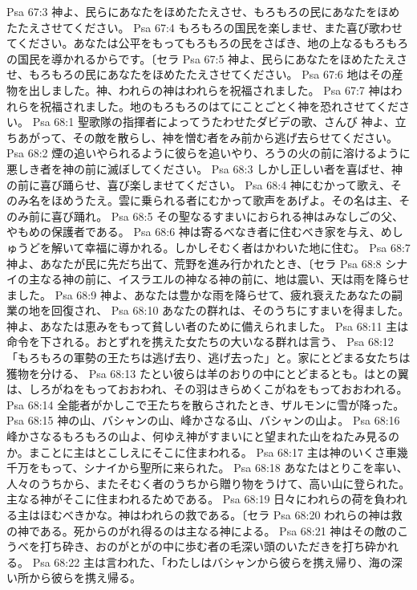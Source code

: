 Psa 67:3  神よ、民らにあなたをほめたたえさせ、もろもろの民にあなたをほめたたえさせてください。
Psa 67:4  もろもろの国民を楽しませ、また喜び歌わせてください。あなたは公平をもってもろもろの民をさばき、地の上なるもろもろの国民を導かれるからです。〔セラ
Psa 67:5  神よ、民らにあなたをほめたたえさせ、もろもろの民にあなたをほめたたえさせてください。
Psa 67:6  地はその産物を出しました。神、われらの神はわれらを祝福されました。
Psa 67:7  神はわれらを祝福されました。地のもろもろのはてにことごとく神を恐れさせてください。
Psa 68:1  聖歌隊の指揮者によってうたわせたダビデの歌、さんび 神よ、立ちあがって、その敵を散らし、神を憎む者をみ前から逃げ去らせてください。
Psa 68:2  煙の追いやられるように彼らを追いやり、ろうの火の前に溶けるように悪しき者を神の前に滅ぼしてください。
Psa 68:3  しかし正しい者を喜ばせ、神の前に喜び踊らせ、喜び楽しませてください。
Psa 68:4  神にむかって歌え、そのみ名をほめうたえ。雲に乗られる者にむかって歌声をあげよ。その名は主、そのみ前に喜び踊れ。
Psa 68:5  その聖なるすまいにおられる神はみなしごの父、やもめの保護者である。
Psa 68:6  神は寄るべなき者に住むべき家を与え、めしゅうどを解いて幸福に導かれる。しかしそむく者はかわいた地に住む。
Psa 68:7  神よ、あなたが民に先だち出て、荒野を進み行かれたとき、〔セラ
Psa 68:8  シナイの主なる神の前に、イスラエルの神なる神の前に、地は震い、天は雨を降らせました。
Psa 68:9  神よ、あなたは豊かな雨を降らせて、疲れ衰えたあなたの嗣業の地を回復され、
Psa 68:10  あなたの群れは、そのうちにすまいを得ました。神よ、あなたは恵みをもって貧しい者のために備えられました。
Psa 68:11  主は命令を下される。おとずれを携えた女たちの大いなる群れは言う、
Psa 68:12  「もろもろの軍勢の王たちは逃げ去り、逃げ去った」と。家にとどまる女たちは獲物を分ける、
Psa 68:13  たとい彼らは羊のおりの中にとどまるとも。はとの翼は、しろがねをもっておおわれ、その羽はきらめくこがねをもっておおわれる。
Psa 68:14  全能者がかしこで王たちを散らされたとき、ザルモンに雪が降った。
Psa 68:15  神の山、バシャンの山、峰かさなる山、バシャンの山よ。
Psa 68:16  峰かさなるもろもろの山よ、何ゆえ神がすまいにと望まれた山をねたみ見るのか。まことに主はとこしえにそこに住まわれる。
Psa 68:17  主は神のいくさ車幾千万をもって、シナイから聖所に来られた。
Psa 68:18  あなたはとりこを率い、人々のうちから、またそむく者のうちから贈り物をうけて、高い山に登られた。主なる神がそこに住まわれるためである。
Psa 68:19  日々にわれらの荷を負われる主はほむべきかな。神はわれらの救である。〔セラ
Psa 68:20  われらの神は救の神である。死からのがれ得るのは主なる神による。
Psa 68:21  神はその敵のこうべを打ち砕き、おのがとがの中に歩む者の毛深い頭のいただきを打ち砕かれる。
Psa 68:22  主は言われた、「わたしはバシャンから彼らを携え帰り、海の深い所から彼らを携え帰る。

